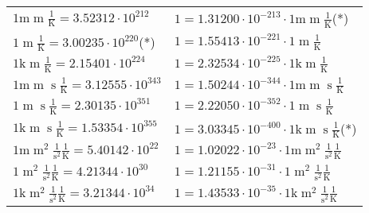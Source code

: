 \begin{center}
\begin{longtable}{l l}
{\color{gray}$1 \bm{\mathrm{ m}}{\operatorname{m}}{}{}\frac1{\operatorname{K}} = 3.52312\cdot10^{212} $}   & {\color{gray}$ 1 = 1.31200\cdot10^{-213} \cdot 1 \bm{\mathrm{ m}}{\operatorname{m}}{}{}\frac1{\operatorname{K}}$}\quad(*)\\
{\color{black}$1 \bm{\mathrm{ }}{\operatorname{m}}{}{}\frac1{\operatorname{K}} = 3.00235\cdot10^{220} $}\quad(*) & {\color{black}$ 1 = 1.55413\cdot10^{-221} \cdot 1 \bm{\mathrm{ }}{\operatorname{m}}{}{}\frac1{\operatorname{K}}$}  \\
{\color{gray}$1 \bm{\mathrm{ k}}{\operatorname{m}}{}{}\frac1{\operatorname{K}} = 2.15401\cdot10^{224} $}   & {\color{gray}$ 1 = 2.32534\cdot10^{-225} \cdot 1 \bm{\mathrm{ k}}{\operatorname{m}}{}{}\frac1{\operatorname{K}}$}  \\
{\color{gray}$1 \bm{\mathrm{ m}}{\operatorname{m}}{\operatorname{s}}{}\frac1{\operatorname{K}} = 3.12555\cdot10^{343} $}   & {\color{gray}$ 1 = 1.50244\cdot10^{-344} \cdot 1 \bm{\mathrm{ m}}{\operatorname{m}}{\operatorname{s}}{}\frac1{\operatorname{K}}$}  \\
{\color{black}$1 \bm{\mathrm{ }}{\operatorname{m}}{\operatorname{s}}{}\frac1{\operatorname{K}} = 2.30135\cdot10^{351} $}   & {\color{black}$ 1 = 2.22050\cdot10^{-352} \cdot 1 \bm{\mathrm{ }}{\operatorname{m}}{\operatorname{s}}{}\frac1{\operatorname{K}}$}  \\
{\color{gray}$1 \bm{\mathrm{ k}}{\operatorname{m}}{\operatorname{s}}{}\frac1{\operatorname{K}} = 1.53354\cdot10^{355} $}   & {\color{gray}$ 1 = 3.03345\cdot10^{-400} \cdot 1 \bm{\mathrm{ k}}{\operatorname{m}}{\operatorname{s}}{}\frac1{\operatorname{K}}$}\quad(*)\\
{\color{gray}$1 \bm{\mathrm{ m}}{\operatorname{m}^2}\frac1{\operatorname{s}^2}{}\frac1{\operatorname{K}} = 5.40142\cdot10^{22} $}   & {\color{gray}$ 1 = 1.02022\cdot10^{-23} \cdot 1 \bm{\mathrm{ m}}{\operatorname{m}^2}\frac1{\operatorname{s}^2}{}\frac1{\operatorname{K}}$}  \\
{\color{black}$1 \bm{\mathrm{ }}{\operatorname{m}^2}\frac1{\operatorname{s}^2}{}\frac1{\operatorname{K}} = 4.21344\cdot10^{30} $}   & {\color{black}$ 1 = 1.21155\cdot10^{-31} \cdot 1 \bm{\mathrm{ }}{\operatorname{m}^2}\frac1{\operatorname{s}^2}{}\frac1{\operatorname{K}}$}  \\
{\color{gray}$1 \bm{\mathrm{ k}}{\operatorname{m}^2}\frac1{\operatorname{s}^2}{}\frac1{\operatorname{K}} = 3.21344\cdot10^{34} $}   & {\color{gray}$ 1 = 1.43533\cdot10^{-35} \cdot 1 \bm{\mathrm{ k}}{\operatorname{m}^2}\frac1{\operatorname{s}^2}{}\frac1{\operatorname{K}}$}  \\

\end{longtable}
\end{center}
